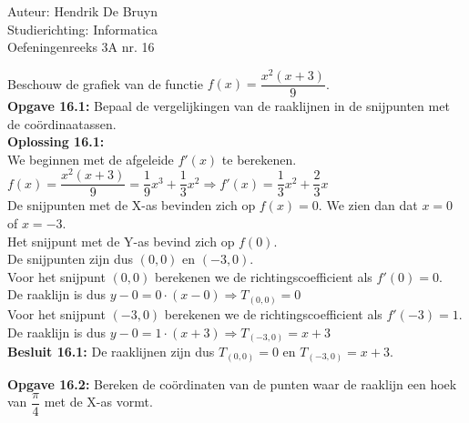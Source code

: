 \documentclass[a4paper]{article}
\begin{document}
  
\noindent \large Auteur: Hendrik De Bruyn \\
\noindent \large Studierichting: Informatica\\
\noindent \large Oefeningenreeks 3A nr. 16\\

\medskip

\normalsize

Beschouw de grafiek van de functie $f(x) = \dfrac{x^2(x+3)}{9}$. \\

\textbf{Opgave 16.1:} Bepaal de vergelijkingen van de raaklijnen in de snijpunten met de coördinaatassen. \\

\textbf{Oplossing 16.1:} \\

We beginnen met de afgeleide $f'(x)$ te berekenen. \\

$f(x) = \dfrac{x^2(x+3)}{9} = \dfrac{1}{9}x^3 + \dfrac{1}{3}x^2 \Rightarrow f'(x) = \dfrac{1}{3}x^2 + \dfrac{2}{3}x$ \\

De snijpunten met de X-as bevinden zich op $f(x) = 0$. We zien dan dat $x = 0$ of $x = -3$. \\

Het snijpunt met de Y-as bevind zich op $f(0)$. \\

De snijpunten zijn dus $(0, 0)$ en $(-3, 0)$. \\

Voor het snijpunt $(0, 0)$ berekenen we de richtingscoefficient als $f'(0) = 0$. \\

De raaklijn is dus $y - 0 = 0 \cdot (x - 0) \Rightarrow T_{(0, 0)} = 0$ \\

Voor het snijpunt $(-3, 0)$ berekenen we de richtingscoefficient als $f'(-3) = 1$. \\

De raaklijn is dus $y - 0 = 1 \cdot (x + 3) \Rightarrow T_{(-3, 0)} = x + 3$ \\

\textbf{Besluit 16.1:} De raaklijnen zijn dus $T_{(0, 0)} = 0$ en $T_{(-3, 0)} = x + 3$. \\

\newpage

\textbf{Opgave 16.2:} Bereken de coördinaten van de punten waar de raaklijn een hoek van $\dfrac{\pi}{4}$ met de X-as vormt. \\
\end{document}
